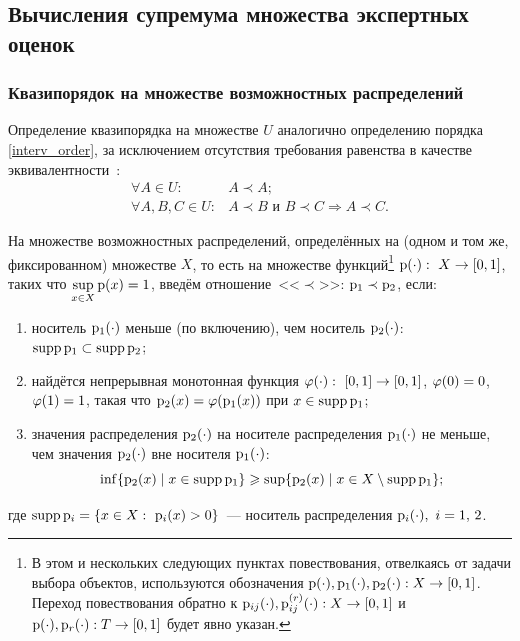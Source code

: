 \subsection{Вычисления супремума множества экспертных оценок}
\label{easy_collective_sup}

\subsubsection{Квазипорядок на множестве возможностных распределений}
\label{preorder_pyt}

Определение квазипорядка на множестве $U$ аналогично определению порядка \eqref{interv_order}, за исключением отсутствия требования равенства в качестве эквивалентности~\cite{Mirkin}:  
 \begin{equation}
\label{preoder_def}
\begin{split}
\forall A \in U: & A \prec A; \\
\forall A, B, C \in U: & A \prec B \text{ и } B \prec C \Rightarrow A \prec C.
\end{split}
\end{equation}

На множестве возможностных распределений, определённых на (одном и том же, фиксированном) множестве $X$, то есть на множестве функций\footnote{В этом и нескольких следующих пунктах повествования, отвелкаясь от задачи выбора объектов, используются обозначения ${\mathrm{p}}(\cdot), {\mathrm{p}}_1(\cdot), {\mathrm{p}}_2(\cdot): X\to [0,1]$. Переход повествования обратно к ${\mathrm{p}}_{ij}(\cdot),{\mathrm{p}}_{ij}^{(r)}(\cdot): X\to [0,1] $ и ${\mathrm{p}}(\cdot),{\mathrm{p}}_{r}(\cdot): T\to [0,1] $ будет явно указан.} ${\mathrm{p}}(\cdot):\ X\to[0,1]$, таких что $\displaystyle \sup_{x\in X} {\mathrm{p}}(x) = 1$, введём отношение~<<$\prec$>>: ${\mathrm{p}}_1\prec{\mathrm{p}}_2$, если:
\begin{enumerate}
    \item\label{order-D1}
        носитель ${\mathrm{p}}_1(\cdot)$ меньше (по включению), чем носитель ${\mathrm{p}}_2(\cdot)$: ${\mathrm{supp}}\,{\mathrm{p}}_1\subset{\mathrm{supp}}\,{\mathrm{p}}_2$;
    \item\label{order-D2}
        найдётся непрерывная монотонная функция ${\mygamma(\cdot):\ [0,1]\to[0,1]}$, $\varphi(0) = 0$, $\varphi(1) = 1$, такая что ${\mathrm{p}}_2(x) = \varphi({\mathrm{p}}_1(x))$ при $x\in{\mathrm{supp}}\,{\mathrm{p}}_1$;
    \item\label{order-D3}
        значения распределения ${\mathrm{p}}_2(\cdot)$ на носителе распределения ${\mathrm{p}}_1(\cdot)$ не меньше, чем значения ${\mathrm{p}}_2(\cdot)$ вне носителя ${\mathrm{p}}_1(\cdot)$:
        $$\inf\{{\mathrm{p}}_2(x) \mid x\in{\mathrm{supp}}\,{\mathrm{p}}_1\} \geqslant \sup\{{\mathrm{p}}_2(x) \mid x\in X\setminus{\mathrm{supp}}\,{\mathrm{p}}_1\};$$
\end{enumerate}
где ${\mathrm{supp}}\, {\mathrm{p}}_i = \{x\in X:\ {\mathrm{p}}_i(x) > 0\}$~--- носитель распределения ${\mathrm{p}}_i(\cdot),\ i=1,\, 2$.


